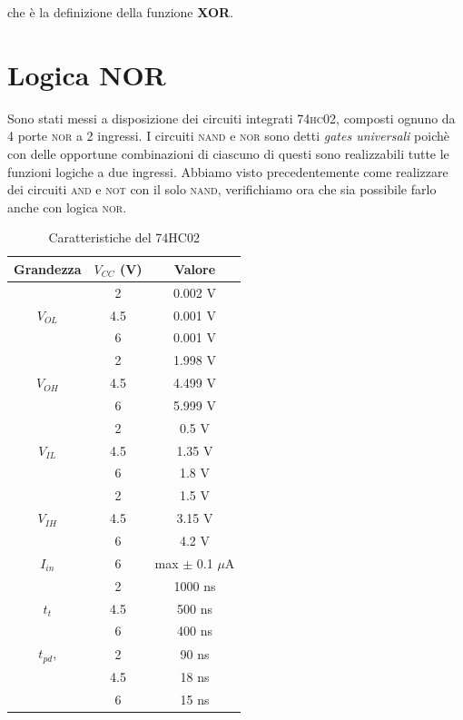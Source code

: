 \documentclass[journal, a4paper]{IEEEtran}
\begin{document}
che è la definizione della funzione \textbf{XOR}.

\section{Logica NOR}
Sono stati messi a disposizione dei circuiti integrati \textsc{74hc02}, composti ognuno da 4 porte \textsc{nor} a 2 ingressi. I circuiti \textsc{nand} e \textsc{nor} sono detti \textit{gates universali} poichè con delle opportune combinazioni di ciascuno di questi sono realizzabili tutte le funzioni logiche a due ingressi. Abbiamo visto precedentemente come realizzare dei circuiti \textsc{and} e \textsc{not} con il solo \textsc{nand}, verifichiamo ora che sia possibile farlo anche con logica \textsc{nor}.\\

\begin{table}
\centering
\caption{Caratteristiche del 74HC02}
\label{tab:data}
\begin{tabular}{|c|c|c|}
  \hline
  Grandezza & $V_{CC}$ (V)& Valore \\
  \hline
           &  2  &  0.002 V \\ \cline{2-3}
  $V_{OL}$ & 4.5  &  0.001 V \\ \cline{2-3}
           & 6  &  0.001 V \\ 
  \hline 
           &  2  &  1.998 V \\ \cline{2-3}
  $V_{OH}$ & 4.5  &  4.499 V \\ \cline{2-3}
           & 6  & 5.999 V \\ 
  \hline \hline
           &  2  &  0.5 V \\ \cline{2-3}
  $V_{IL}$ & 4.5  &  1.35 V \\ \cline{2-3}
           & 6  &  1.8 V \\ 
  \hline 
           &  2  &  1.5 V \\ \cline{2-3}
  $V_{IH}$ & 4.5  & 3.15 V \\ \cline{2-3}
           & 6  &   4.2 V \\    
  \hline \hline
  $I_{in}$ & 6  & max $\pm$ 0.1 $\mu$A\\
  \hline \hline
            &  2  &  1000  ns \\ \cline{2-3}
  $t_{t}$ & 4.5  &  500  ns \\ \cline{2-3}
            & 6  &   400  ns \\
  \hline 
  $t_{pd}$, &  2  &  90  ns \\ \cline{2-3}
 			  & 4.5  &   18  ns \\ \cline{2-3}
             & 6  &   15  ns \\
  \hline
\end{tabular}
\end{table}
\end{document}
